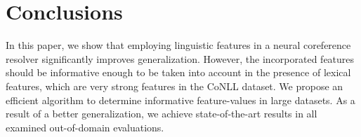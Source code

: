 \section{Conclusions}
In this paper, we show that employing linguistic features 
in a neural coreference resolver significantly improves generalization.
However, the incorporated features should be informative enough 
to be taken into account in the presence of lexical features, 
which are very strong features in the CoNLL dataset.
We propose an efficient algorithm to determine informative feature-values in large datasets.
As a result of a better generalization, we achieve state-of-the-art results in all examined out-of-domain evaluations.
